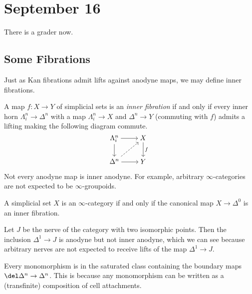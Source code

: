 \documentclass[../notes.tex]{subfiles}
\begin{document}
\section{September 16}
There is a grader now.

\subsection{Some Fibrations}
Just as Kan fibrations admit lifts against anodyne maps, we may define inner fibrations.
\begin{definition}
	A map $f\colon X\to Y$ of simplicial sets is an \textit{inner fibration} if and only if every inner horn $\Lambda^n_i\to\Delta^n$ with a map $\Lambda^n_i\to X$ and $\Delta^n\to Y$ (commuting with $f$) admits a lifting making the following diagram commute.
	\[\begin{tikzcd}[cramped]
		{\Lambda^n_i} & X \\
		{\Delta^n} & Y
		\arrow[from=1-1, to=1-2]
		\arrow[from=1-1, to=2-1]
		\arrow["f", from=1-2, to=2-2]
		\arrow[dashed, from=2-1, to=1-2]
		\arrow[from=2-1, to=2-2]
	\end{tikzcd}\]
\end{definition}
\begin{remark}
	Not every anodyne map is inner anodyne. For example, arbitrary $\infty$-categories are not expected to be $\infty$-groupoids.
\end{remark}
\begin{example}
	A simplicial set $X$ is an $\infty$-category if and only if the canonical map $X\to\Delta^0$ is an inner fibration.
\end{example}
\begin{example}
	Let $J$ be the nerve of the category with two isomorphic points. Then the inclusion $\Delta^1\to J$ is anodyne but not inner anodyne, which we can see because arbitrary nerves are not expected to receive lifts of the map $\Delta^1\to J$.
\end{example}
\begin{remark}
	Every monomorphism is in the saturated class containing the boundary maps $\del\Delta^n\to\Delta^n$. This is because any monomorphism can be written as a (transfinite) composition of cell attachments.
\end{remark}
\end{document}

